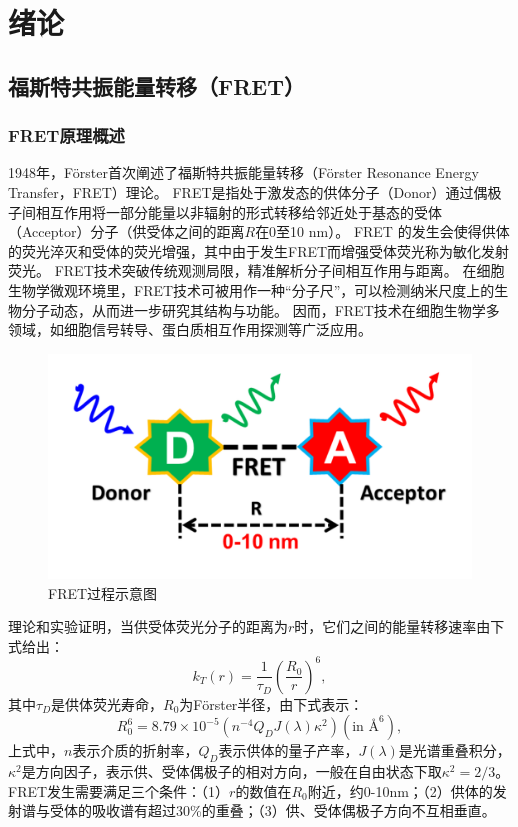\chapter{绪论}

\section{福斯特共振能量转移（FRET）}

\subsection{FRET原理概述}

\ifshowtext
1948年，Förster首次阐述了福斯特共振能量转移（Förster Resonance Energy Transfer，FRET）理论。
FRET是指处于激发态的供体分子（Donor）通过偶极子间相互作用将一部分能量以非辐射的形式转移给邻近处于基态的受体（Acceptor）分子（供受体之间的距离$R$在0至10 nm）。
FRET 的发生会使得供体的荧光淬灭和受体的荧光增强，其中由于发生FRET而增强受体荧光称为敏化发射荧光。
FRET技术突破传统观测局限，精准解析分子间相互作用与距离。
在细胞生物学微观环境里，FRET技术可被用作一种“分子尺”，可以检测纳米尺度上的生物分子动态，从而进一步研究其结构与功能。
因而，FRET技术在细胞生物学多领域，如细胞信号转导、蛋白质相互作用探测等广泛应用。
\begin{figure}[htbp]
    \centering
    \includegraphics[width=0.5\linewidth]{../figures/1/1_FRET过程示意图.png}
    \caption{FRET过程示意图}
    \label{fig:fret}
\end{figure}

理论和实验证明，当供受体荧光分子的距离为$r$时，它们之间的能量转移速率由下式给出：
\begin{equation}
    k_T(r)=\frac{1}{\tau_D}(\frac{R_0}{r})^6, \label{eq:1-1}
\end{equation}
其中$\tau_D$是供体荧光寿命，$R_0$为Förster半径，由下式表示：
\begin{equation}
    R_0^6=8.79\times{10^{-5}}(n^{-4}Q_DJ(\lambda)\kappa^2)(\text{in~} \mbox{\AA}^6),
\end{equation}
上式中，$n$表示介质的折射率，$Q_D$表示供体的量子产率，$J(\lambda)$是光谱重叠积分，$\kappa^2$是方向因子，表示供、受体偶极子的相对方向，一般在自由状态下取$\kappa^2=2/3$。FRET发生需要满足三个条件：（1）$r$的数值在$R_0$附近，约0-10nm；（2）供体的发射谱与受体的吸收谱有超过30\%的重叠；（3）供、受体偶极子方向不互相垂直。


